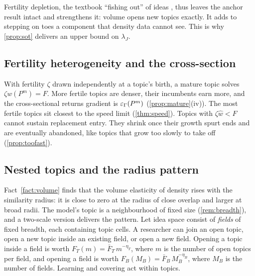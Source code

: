 Fertility depletion, the textbook ``fishing out'' of ideas \citep{kortum1997}, thus
leaves the anchor result intact and strengthens it: volume opens new topics
exactly. It adds to stepping on toes a component that density data cannot
see. This is why \cref{prop:sot} delivers an upper bound on $\lambda_J$.

\subsection{Fertility heterogeneity and the cross-section}

With fertility $\zeta$ drawn independently at a topic's birth, a mature topic
solves $\zeta w(P^m)=F$. More fertile topics are denser, their incumbents earn
more, and the cross-sectional returns gradient is $\varepsilon_\Gamma(P^m)$
(\cref{prop:mature}(iv)). The most fertile topics sit closest to the speed
limit (\cref{thm:speed}). Topics with $\zeta\hat w<F$ cannot sustain
replacement entry. They shrink once their growth spurt ends and are eventually
abandoned, like topics that grow too slowly to take off (\cref{prop:toofast}).

\subsection{Nested topics and the radius pattern}\label{app:nested}

Fact~\ref{fact:volume} finds that the volume elasticity of density rises with
the similarity radius: it is close to zero at the radius of close overlap and
larger at broad radii. The model's topic is a neighbourhood of fixed size
(\cref{rem:breadth}), and a two-scale version delivers the pattern. Let idea
space consist of \emph{fields} of fixed breadth, each containing topic cells.
A researcher can join an open topic, open a new topic inside an existing field,
or open a new field. Opening a topic inside a field is worth
$F_T(m)=\bar F_T\,m^{-\eta_T}$, where $m$ is the number of open topics per field,
and opening a field is worth $F_B(M_B)=\bar F_B\,M_B^{-\eta_B}$, where $M_B$ is
the number of fields. Learning and covering act within topics.

